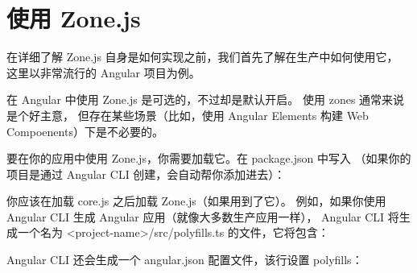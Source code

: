 \section{使用 Zone.js}


在详细了解 Zone.js 自身是如何实现之前，我们首先了解在生产中如何使用它，
这里以非常流行的 Angular 项目为例。


在 Angular 中使用 Zone.js 是可选的，不过却是默认开启。
使用 zones 通常来说是个好主意，
但存在某些场景（比如，使用 Angular Elements 构建 Web Compoenents）下是不必要的。


要在你的应用中使用 Zone.js，你需要加载它。在 package.json 中写入
（如果你的项目是通过 Angular CLI 创建，会自动帮你添加进去）：




你应该在加载 core.js 之后加载 Zone.js（如果用到了它）。
例如，如果你使用 Angular CLI 生成 Angular 应用（就像大多数生产应用一样），
Angular CLI 将生成一个名为 <project-name>/src/polyfills.ts 的文件，它将包含：




Angular CLI 还会生成一个 angular.json 配置文件，该行设置 polyfills：

